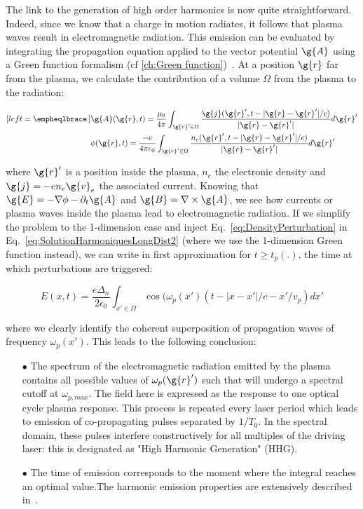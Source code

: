 \noindent The link to the generation of high order harmonics is now quite straightforward.
Indeed, since we know that a charge in motion radiates, it follows that plasma waves result in electromagnetic radiation. This emission can be evaluated by integrating the propagation equation applied to the vector potential $\g{A}$ using a Green function formalism (cf \ref{ch:Green function})~\cite{LandauLip}. At a position $\g{r}$ far from the plasma, we calculate the contribution of a volume $\Omega$ from the plasma to the radiation:

\begin{subequations}
\label{eq:SolutionHarmoniquesLongDist}
\begin{align}[left = \empheqlbrace\,]
&\g{A}(\g{r},t) = \frac{\mu_0}{4\pi} \int_{\g{r}' \in \Omega}\frac{\g{j}(\g{r}',t-|\g{r}-\g{r}'|/c)}{|\g{r}-\g{r}'|}d\g{r}' \\
&\phi(\g{r},t) = \frac{-e}{4\pi\epsilon_0} \int_{\g{r}' \in \Omega}\frac{n_e(\g{r}',t-|\g{r}-\g{r}'|/c)}{|\g{r}-\g{r}'|}d\g{r}'\label{eq:SolutionHarmoniquesLongDist2}
\end{align}
\end{subequations}

\noindent where $\g{r}'$ is a position inside the plasma, $n_e$ the electronic density and $\g{j} = -en_e\g{v}_e$ the associated current. Knowing that $\g{E} = -\nabla \phi - \partial_t \g{A}$ and $\g{B} = \nabla\times \g{A}$, we see how currents or plasma waves inside the plasma lead to electromagnetic radiation. If we simplify the problem to the 1-dimension case and inject Eq.~\ref{eq:DensityPerturbation} in Eq.~\ref{eq:SolutionHarmoniquesLongDist2} (where we use the 1-dimension Green function instead), we can write in first approximation for $t\ge t_p(.)$, the time at which perturbations are triggered:

$$
E(x,t) = \frac{e\Delta_n}{2\epsilon_0} \int_{x' \in \Omega}\cos(\omega_p(x')(t-|x-x'|/c-x'/v_p)dx'
$$

\noindent  where we clearly identify the coherent superposition of propagation waves of frequency $\omega_p(x')$. This leads to the following conclusion: 
\begin{itemize}
\item[$\bullet$] The spectrum of the electromagnetic radiation emitted by the plasma contains all possible values of $\omega_p(\g{r}')$ such that  will undergo a spectral cutoff at $\omega_{p,max}$. The field here is expressed as the response to one optical cycle plasma response. This process is repeated every laser period which leads to emission of co-propagating pulses separated by $1/T_0$. In the spectral domain, these pulses interfere constructively for all multiples of the driving laser: this is designated as "High Harmonic Generation" (HHG).
\item[$\bullet$] The time of emission corresponds to the moment where the integral reaches an optimal value.The harmonic emission properties are extensively described in~\cite{thaury2010high}.
\end{itemize}


